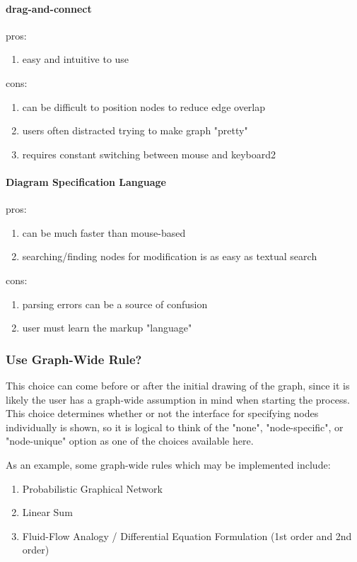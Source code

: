\documentclass[conference]{IEEEtran}
\begin{document}
\paragraph{drag-and-connect}
pros:
\begin{enumerate}
  \item{easy and intuitive to use}
\end{enumerate}
cons:
\begin{enumerate}
 \item can be difficult to position nodes to reduce edge overlap
 \item users often distracted trying to make graph "pretty"
 \item requires constant switching between mouse and keyboard2
\end{enumerate}

\paragraph{Diagram Specification Language}
pros:
\begin{enumerate}
 \item can be much faster than mouse-based
 \item searching/finding nodes for modification is as easy as textual search
\end{enumerate}

cons:
\begin{enumerate}
 \item parsing errors can be a source of confusion
 \item user must learn the markup "language"
\end{enumerate}

\subsubsection{Use Graph-Wide Rule?}
This choice can come before or after the initial drawing of the graph, since it is likely the user has a graph-wide assumption in mind when starting the process. 
This choice determines whether or not the interface for specifying nodes individually is shown, so it is logical to think of the "none", "node-specific", or "node-unique" option as one of the choices available here. 

As an example, some graph-wide rules which may be implemented include:
\begin{enumerate}
  \item Probabilistic Graphical Network
  \item Linear Sum
  \item Fluid-Flow Analogy / Differential Equation Formulation (1st order and 2nd order)
\end{enumerate}
\end{document}

